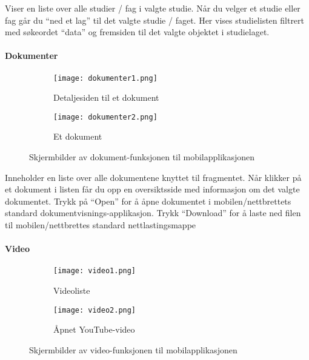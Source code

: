 \documentclass[../main.tex]{subfiles}
\begin{document}
Viser en liste over alle studier / fag i valgte studie. Når du velger et studie eller fag går du “ned et lag” til det valgte studie / faget. Her vises studielisten filtrert med søkeordet “data” og fremsiden til det valgte objektet i studielaget.

\paragraph{Dokumenter}

\begin{figure}[H]
        \centering
        \begin{subfigure}[b]{0.3\textwidth}
                \centering
                \texttt{[image: dokumenter1.png]}
                \caption{Detaljesiden til et dokument}
        \end{subfigure}
        \quad
        \begin{subfigure}[b]{0.3\textwidth}
                \centering
                \texttt{[image: dokumenter2.png]}
                \caption{Et dokument}
        \end{subfigure}
        \caption{Skjermbilder av dokument-funksjonen til mobilapplikasjonen}
\end{figure}

Inneholder en liste over alle dokumentene knyttet til fragmentet. Når klikker på et dokument i listen får du opp en oversiktsside med informasjon om det valgte dokumentet. Trykk på “Open” for å åpne dokumentet i mobilen/nettbrettets standard dokumentvisnings-applikasjon. Trykk “Download” for å laste ned filen til mobilen/nettbrettes standard nettlastingsmappe

\paragraph{Video}

\begin{figure}[H]
        \centering
        \begin{subfigure}[b]{0.3\textwidth}
                \centering
                \texttt{[image: video1.png]}
                \caption{Videoliste}
        \end{subfigure}
        \quad
        \begin{subfigure}[b]{0.3\textwidth}
                \centering
                \texttt{[image: video2.png]}
                \caption{Åpnet YouTube-video}
        \end{subfigure}
        \caption{Skjermbilder av video-funksjonen til mobilapplikasjonen}
\end{figure}
\end{document}
